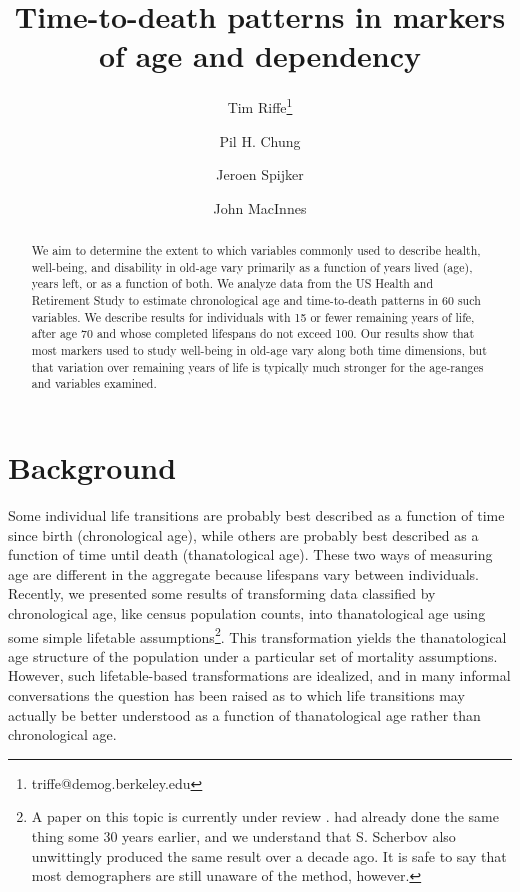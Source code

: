\documentclass{article}
\begin{document}
\title{Time-to-death patterns in markers of age and dependency}

\author[1]{Tim Riffe\thanks{triffe@demog.berkeley.edu}}
\author[1]{Pil H. Chung}
\author[2,3]{Jeroen Spijker}
\author[4]{John MacInnes}

\maketitle

\begin{abstract}
We aim to determine the extent to which variables commonly
used to describe health, well-being, and disability in old-age vary primarily
as a function of years lived (age), years left, or as a function of both. We analyze data from the US Health and Retirement Study to estimate
chronological age and time-to-death patterns in 60 such variables. We describe
results for individuals with 15 or fewer remaining years of life, after age 70
and whose completed lifespans do not exceed 100. Our results show that most
markers used to study well-being in old-age vary along both time dimensions, but
that variation over remaining years of life is typically much stronger for
the age-ranges and variables examined.
\end{abstract}

\section{Background}
Some individual life transitions are probably best described as a function of
time since birth (chronological age), while others are probably best described as a
function of time until death (thanatological age). These two ways of
measuring age are different in the aggregate because lifespans vary between
individuals.
Recently, we presented some results of transforming
data classified by chronological age, like census population counts, into
thanatological age using some simple lifetable
assumptions\footnote{A paper on this topic is
currently under review \citep{riffe2014paaposter}. \citet{brouard1986structure,
brouard1989mouvements} had already done the same thing some 30 years earlier, and we understand that
S. Scherbov also unwittingly produced the same result over a decade ago. It is
safe to say that most demographers are still unaware of the method, however.}.
This transformation yields the thanatological age structure of the population
under a particular set of mortality assumptions.
However, such lifetable-based transformations are idealized, and in many informal
conversations the question has been raised as to which life transitions
may actually be better understood as a function of thanatological
age rather than chronological age.
\end{document}
